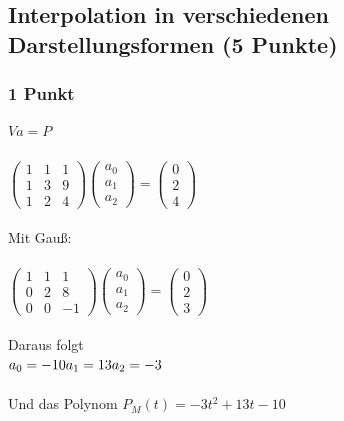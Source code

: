 \newif\ifvimbug
\vimbugfalse

\ifvimbug

\fi


\subsection{Interpolation in verschiedenen Darstellungsformen (5 Punkte)}
\subsubsection{1 Punkt}
$Va = P$\\
\\
$\begin{pmatrix}
1 & 1 & 1 \\ 
1 & 3 & 9 \\ 
1 & 2 & 4
\end{pmatrix} \begin{pmatrix}
a_{0} \\ 
a_{1} \\ 
a_{2}
\end{pmatrix} = \begin{pmatrix}
0 \\ 
2 \\ 
4
\end{pmatrix} $\\
\\
Mit Gauß:\\
\\
$\begin{pmatrix}
1 & 1 & 1 \\ 
0 & 2 & 8 \\ 
0 & 0 & -1
\end{pmatrix} \begin{pmatrix}
a_{0} \\ 
a_{1} \\ 
a_{2}
\end{pmatrix} = \begin{pmatrix}
0 \\ 
2 \\ 
3
\end{pmatrix} $\\
\\
Daraus folgt \\
$a_{0} = -10 \\
a_{1} = 13 \\
a_{2} = -3$ \\
\\
Und das Polynom $P_{M}(t) = -3t^{2} + 13t - 10$\\

